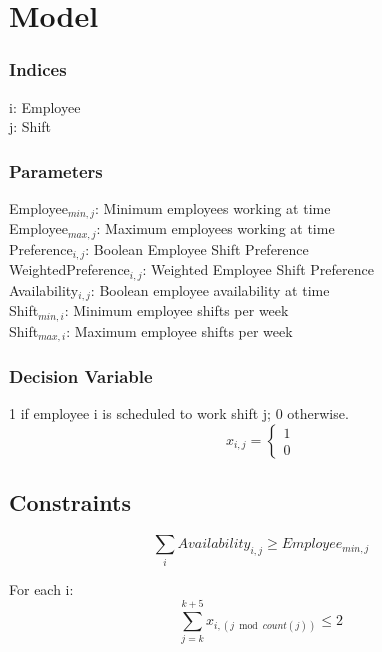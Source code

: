 \chapter{Model}

\subsection{Indices}
i: Employee\\
j: Shift\\

\subsection{Parameters}
Employee$_{min,j}$: Minimum employees working at time\\
Employee$_{max,j}$: Maximum employees working at time\\
Preference$_{i,j}$: Boolean Employee Shift Preference\\
WeightedPreference$_{i,j}$: Weighted Employee Shift Preference\\
Availability$_{i,j}$: Boolean employee availability at time\\
Shift$_{min,i}$: Minimum employee shifts per week\\
Shift$_{max,i}$: Maximum employee shifts per week

\subsection{Decision Variable}
1 if employee i is scheduled to work shift j; 0 otherwise.
$$x_{i,j} =
 \begin{cases}
   1 \\
   0 
   
 \end{cases}
 $$

\section{Constraints}


$$\begin{equation}\label{availability} \sum\limits_{i} Availability_{i,j} \ge Employee_{min,j} \end{equation}

$$

 For each i: \\
$$ \begin{equation}\label{daylimit}\sum\limits_{j = k}^{k+5} x_{i,( j\bmod{count(j)})} \le 2 \end{equation} $$

